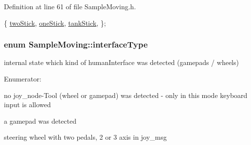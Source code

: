 Definition at line 61 of file Sample\-Moving.\-h.


\begin{DoxyCode}
        \{
            \hyperlink{classSampleMoving_ad45933bb8e660772ea25747d3446bd8aa34ec1e09ac95890b7840157db35fe828}{twoStick},   
            \hyperlink{classSampleMoving_ad45933bb8e660772ea25747d3446bd8aaf949a715587ed74b5cb1f8199e3f369d}{oneStick},   
            \hyperlink{classSampleMoving_ad45933bb8e660772ea25747d3446bd8aaa424c4ac1573cab2407925cf755474ba}{tankStick}, 
        \};
\end{DoxyCode}
\hypertarget{classSampleMoving_ad495d48e1ec2093a36601548bfad852d}{
\subsubsection[{interface\-Type}]{\setlength{\rightskip}{0pt plus 5cm}enum {\bf Sample\-Moving\-::interface\-Type}\hspace{0.3cm}{\ttfamily [private]}}}\label{classSampleMoving_ad495d48e1ec2093a36601548bfad852d}


internal state which kind of human\-Interface was detected (gamepads / wheels) 

\begin{Desc}
\item[Enumerator\-: ]\par
\begin{description}
\item[{\em 
\hypertarget{classSampleMoving_ad495d48e1ec2093a36601548bfad852da4ba2232b260456be1ed027bb3bde6b0d}{no\-Joy}\label{classSampleMoving_ad495d48e1ec2093a36601548bfad852da4ba2232b260456be1ed027bb3bde6b0d}
}]no joy\-\_\-node-\/\-Tool (wheel or gamepad) was detected -\/ only in this mode keyboard input is allowed \item[{\em 
\hypertarget{classSampleMoving_ad495d48e1ec2093a36601548bfad852dafd942ead788c486efb6c26363e68acff}{game\-Pad}\label{classSampleMoving_ad495d48e1ec2093a36601548bfad852dafd942ead788c486efb6c26363e68acff}
}]a gamepad was detected \item[{\em 
\hypertarget{classSampleMoving_ad495d48e1ec2093a36601548bfad852da003251f50ad3e22d0ab96167b517d017}{wheel}\label{classSampleMoving_ad495d48e1ec2093a36601548bfad852da003251f50ad3e22d0ab96167b517d017}
}]steering wheel with two pedals, 2 or 3 axis in joy\-\_\-msg \end{description}
\end{Desc}



